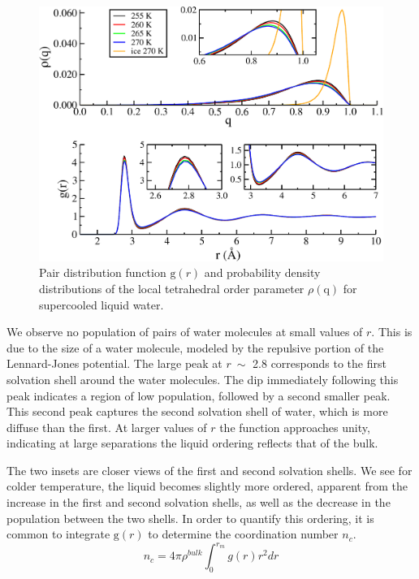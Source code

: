 \begin{figure}
\includegraphics[width=\linewidth]{Figures/bulk_GofrQdens}
\caption{\label{fig:gofrQ} Pair distribution function
  $\mathrm{g}(r)$ and probability density distributions of
  the local tetrahedral order parameter $\rho (\mathrm{q})$ for
  supercooled liquid water.}
\end{figure}  

We observe no population of pairs of water molecules at small values
of $r$. This is due to the size of a water molecule, modeled
by the repulsive portion of the Lennard-Jones potential. The large
peak at $r~\sim$ 2.8 corresponds to the first solvation
shell around the water molecules. The dip immediately following this
peak indicates a region of low population, followed by a second
smaller peak. This second peak captures the second solvation shell of
water, which is more diffuse than the first. At larger values of
$r$ the function approaches unity, indicating at large
separations the liquid ordering reflects that of the bulk. 

The two insets are closer views of the first and second solvation
shells. We see for colder temperature, the liquid becomes slightly
more ordered, apparent from the increase in the first and second
solvation shells, as well as the decrease in the population between
the two shells. In order to quantify this ordering, it is
common to integrate $\mathrm{g}(r)$ to determine the
coordination number $n_c$.
\begin{equation}\label{eq:nofr}
n_c = 4 \pi \rho^{bulk} \int_0^{r_m} g(r)r^2dr
\end{equation}


